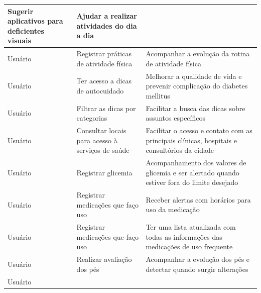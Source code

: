 \begin{table}[htb]
\begin{center}
\begin{tabular}{p{2.0cm}|p{5.0cm}|p{7.0cm}}
            Sugerir aplicativos para deficientes visuais      &
            Ajudar a realizar atividades do dia a dia                                                    \\
            \hline
            Usuário                                           &
            Registrar práticas de atividade física            &
            Acompanhar a evolução da rotina de atividade física                                          \\
            \hline
            Usuário                                           &
            Ter acesso a dicas de autocuidado                 &
            Melhorar a qualidade de vida e prevenir complicação do diabetes mellitus                     \\
            \hline
            Usuário                                           &
            Filtrar as dicas por categorias                   &
            Facilitar a busca das dicas sobre assuntos específicos                                       \\
            \hline
            Usuário                                           &
            Consultar locais para acesso à serviços de saúde  &
            Facilitar o acesso e contato com as principais clínicas, hospitais e consultórios da cidade  \\
            \hline
            Usuário                                           &
            Registrar glicemia                                &
            Acompanhamento dos valores de glicemia e ser alertado quando estiver fora do limite desejado \\
            \hline
            Usuário                                           &
            Registrar medicações que faço uso                 &
            Receber alertas com horários para uso da medicação                                           \\
            \hline
            Usuário                                           &
            Registrar medicações que faço uso                 &
            Ter uma lista atualizada com todas as informações das medicações de uso frequente            \\
            \hline
            Usuário                                           &
            Realizar avaliação dos pés                        &
            Acompanhar a evolução dos pés e detectar quando surgir alterações                            \\
            \hline
            Usuário                                           &

\end{tabular}
\end{center}
\end{table}
